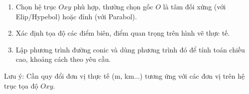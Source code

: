 \begin{enumerate}
\item Chọn hệ trục $Oxy$ phù hợp, thường chọn gốc $O$ là tâm đối xứng (với Elip/Hypebol) hoặc đỉnh (với Parabol).
\item Xác định tọa độ các điểm biên, điểm quan trọng trên hình vẽ thực tế.
\item Lập phương trình đường conic và dùng phương trình đó để tính toán chiều cao, khoảng cách theo yêu cầu.
\end{enumerate}
Lưu ý: Cần quy đổi đơn vị thực tế (m, km...) tương ứng với các đơn vị trên hệ trục tọa độ $Oxy$.
